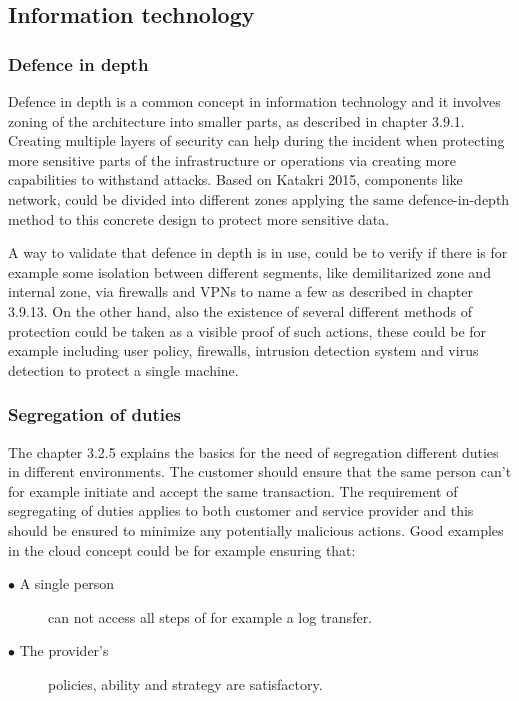 \documentclass{article}
\begin{document}
\subsection{Information technology}


\subsubsection{Defence in depth}
Defence in depth is a common concept in information technology and it involves zoning of the architecture into smaller parts, as described in chapter 3.9.1. Creating multiple layers of security can help during the incident when protecting more sensitive parts of the infrastructure or operations via creating more capabilities to withstand attacks.
Based on Katakri 2015, components like network, could be divided into different zones applying the same defence-in-depth method to this concrete design to protect more sensitive data.
\par
A way to validate that defence in depth is in use, could be to verify if there is for example some isolation between different segments, like demilitarized zone and internal zone, via firewalls and VPNs to name a few as described in chapter 3.9.13. On the other hand, also the existence of several different methods of protection could be taken as a visible proof of such actions, these could be for example including user policy, firewalls, intrusion detection system and virus detection to protect a single machine.

\subsubsection{Segregation of duties}
The chapter 3.2.5 explains the basics for the need of segregation different duties in different environments. The customer should ensure that the same person can't for example initiate and accept the same transaction. The requirement of segregating of duties applies to both customer and service provider and this should be ensured to minimize any potentially malicious actions.
Good examples in the cloud concept could be for example ensuring that:
\begin{description}
	\item[$\bullet$ A single person] can not access all steps of for example a log transfer.
	\item[$\bullet$ The provider's] policies, ability and strategy are satisfactory.
\end{description}
\end{document}
